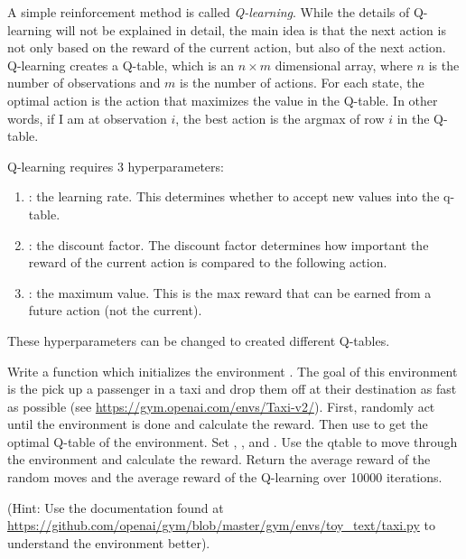 A simple reinforcement method is called \emph{Q-learning}.
While the details of Q-learning will not be explained in detail, the main idea is that the next action is not only based on the reward of the current action, but also of the next action.
Q-learning creates a Q-table, which is an $n\times m$ dimensional array, where $n$ is the number of observations and $m$ is the number of actions.
For each state, the optimal action is the action that maximizes the value in the Q-table.
In other words, if I am at observation $i$, the best action is the argmax of row $i$ in the Q-table.

Q-learning requires 3 hyperparameters:
\begin{enumerate}
\item {}: the learning rate. This determines whether to accept new values into the q-table.
\item {}: the discount factor. The discount factor determines how important the reward of the current action is compared to the following action.
\item {}: the maximum value. This is the max reward that can be earned from a future action (not the current).
\end{enumerate}
These hyperparameters can be changed to created different Q-tables.

\begin{problem}
Write a function  which initializes the environment .
The goal of this environment is the pick up a passenger in a taxi and drop them off at their destination as fast as possible (see \url{https://gym.openai.com/envs/Taxi-v2/}).
First, randomly act until the environment is done and calculate the reward.
Then use  to get the optimal Q-table of the environment.
Set , , and .
Use the qtable to move through the environment and calculate the reward.
Return the average reward of the random moves and the average reward of the Q-learning over 10000 iterations.

(Hint: Use the documentation found at \url{https://github.com/openai/gym/blob/master/gym/envs/toy_text/taxi.py} to understand the environment better).
\label{prob:taxi}
\end{problem}






